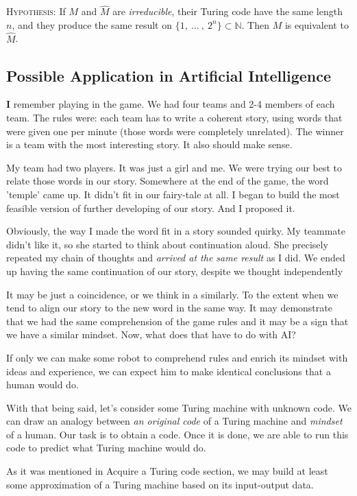 \documentclass[12pt]{article}
\begin{document}
\textsc{Hypothesis}: If $M$ and $\hat{M}$ are \emph{irreducible}, their Turing code have the same length $n$, and they produce the same result on $\{1,\ \dots\ ,\ 2^n\}\subset\mathbb{N}$. Then $M$ is equivalent to $\hat{M}$.

\subsection{Possible Application in Artificial Intelligence}
\textbf{\large I} remember playing in the game. We had four teams and 2-4 members of each team. The rules were: each team has to write a coherent story, using words that were given one per minute (those words were completely unrelated). The winner is a team with the most interesting story. It also should make sense.

My team had two players. It was just a girl and me. We were trying our best to relate those words in our story. Somewhere at the end of the game, the word 'temple' came up. It didn't fit in our fairy-tale at all. I began to build the most feasible version of further developing of our story. And I proposed it.

Obviously, the way I made the word fit in a story sounded quirky. My teammate didn't like it, so she started to think about continuation aloud. She precisely repeated my chain of thoughts and \emph{arrived at the same result} as I did. We ended up having the same continuation of our story, despite we thought independently

It may be just a coincidence, or we think in a similarly. To the extent when we tend to align our story to the new word in the same way. It may demonstrate that we had the same comprehension of the game rules and it may be a sign that we have a similar mindset. Now, what does that have to do with AI?

If only we can make some robot to comprehend rules and enrich its mindset with ideas and experience, we can expect him to make identical conclusions that a human would do.

With that being said, let's consider some Turing machine with unknown code. We can draw an analogy between \emph{an original code} of a Turing machine and \emph{mindset} of a human. Our task is to obtain a code. Once it is done, we are able to run this code to predict what Turing machine would do.

As it was mentioned in \textsf{Acquire a Turing code
} section, we may build at least some approximation of a Turing machine based on its input-output data.
\end{document}
